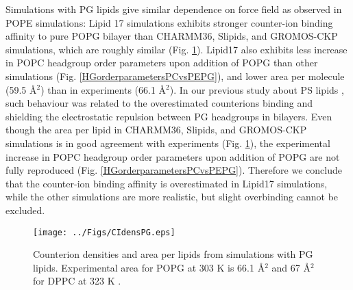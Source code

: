 \documentclass[aps,prl,superscriptaddress,twocolumn]{revtex4}
\begin{document}
Simulations with PG lipids give similar dependence on force field as observed in POPE simulations:
Lipid 17 simulations exhibits stronger counter-ion binding affinity to pure POPG bilayer
than CHARMM36, Slipids, and GROMOS-CKP simulations, which are roughly similar (Fig. \ref{CIdensPG}).
Lipid17 also exhibits less increase in POPC headgroup
order parameters upon addition of POPG than other simulations (Fig. \ref{HGorderparametersPCvsPEPG}),
and lower area per molecule (59.5 {\AA}$^2$) than in experiments (66.1 {\AA}$^2$).
In our previous study about PS lipids \cite{antila18}, such behaviour was related to 
the overestimated counterions binding and shielding the electrostatic repulsion between PG headgroups
in bilayers.%
%
Even though the area per lipid in CHARMM36, Slipids, and GROMOS-CKP simulations is in good agreement
with experiments (Fig. \ref{CIdensPG}), the experimental increase in 
POPC headgroup order parameters upon addition of POPG are not fully reproduced (Fig. \ref{HGorderparametersPCvsPEPG}).
Therefore we conclude that the counter-ion binding affinity is overestimated in Lipid17 simulations,
while the other simulations are more realistic, but slight overbinding cannot be excluded.
\begin{figure}[]
  \centering
  \texttt{[image: ../Figs/CIdensPG.eps]}
  \caption{\label{CIdensPG}
    Counterion densities and area per lipids from simulations with PG lipids.
    Experimental area for POPG at 303 K is 66.1 {\AA}$^2$ and 67 {\AA}$^2$ for DPPC at 323 K \cite{pan12b}.
  }
\end{figure}
\end{document}
